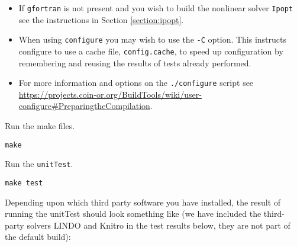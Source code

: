 \documentclass[11pt]{article}
\renewcommand{\_}{{\char"5F}}
\renewcommand{\{}{{\char"7B}}
\renewcommand{\}}{{\char"7D}}
\renewcommand{\^}{{\char"0D}}
\renewcommand{\'}{{\char"0D}}
\begin{document}
\begin{itemize}
\item If {\tt gfortran} is not present and you  wish to build the nonlinear solver {\tt Ipopt} see the instructions in Section \ref{section:ipopt}.

\item When using {\tt configure} you may wish to use the {\tt -C} option. This   instructs configure to use a cache file, {\tt config.cache}, to speed up configuration by remembering and reusing the results of tests already performed.

\item For more information and options on the {\tt ./configure} script see
\url{https://projects.coin-or.org/BuildTools/wiki/user-configure#PreparingtheCompilation}.


\end{itemize}



  Run the make files.

\begin{verbatim}
make
\end{verbatim}

 Run the {\tt unitTest}.

\begin{verbatim}
make test
\end{verbatim}

Depending upon which third party software you have installed, the result of running the unitTest should look something like (we have included the third-party solvers LINDO and Knitro in the  test results below, they are not part of the default build):
\end{document}

